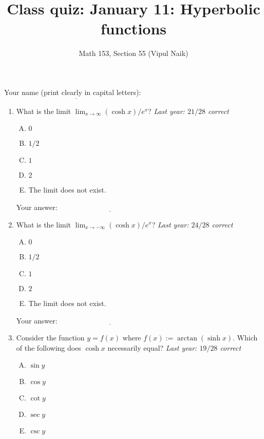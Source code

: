 \documentclass[10pt]{amsart}
\title{Class quiz: January 11: Hyperbolic functions}
\author{Math 153, Section 55 (Vipul Naik)}
\begin{document}
\maketitle

Your name (print clearly in capital letters): $\underline{\qquad\qquad\qquad\qquad\qquad\qquad\qquad\qquad\qquad\qquad}$

\begin{enumerate}
\item What is the limit $\lim_{x \to \infty} (\cosh x)/e^x$? {\em Last
  year: $21/28$ correct}

  \begin{enumerate}[(A)]
  \item $0$
  \item $1/2$
  \item $1$
  \item $2$
  \item The limit does not exist.
  \end{enumerate}

  \vspace{0.1in}
  Your answer: $\underline{\qquad\qquad\qquad\qquad\qquad\qquad\qquad}$
  \vspace{0.4in}

\item What is the limit $\lim_{x \to -\infty} (\cosh x)/e^x$? {\em
  Last year: $24/28$ correct}

  \begin{enumerate}[(A)]
  \item $0$
  \item $1/2$
  \item $1$
  \item $2$
  \item The limit does not exist.
  \end{enumerate}

  \vspace{0.1in}
  Your answer: $\underline{\qquad\qquad\qquad\qquad\qquad\qquad\qquad}$
  \vspace{0.4in}

\item Consider the function $y = f(x)$ where $f(x) := \arctan(\sinh
  x)$. Which of the following does $\cosh x$ necessarily equal? {\em
  Last year: $19/28$ correct}

  \begin{enumerate}[(A)]
  \item $\sin y$
  \item $\cos y$
  \item $\cot y$
  \item $\sec y$
  \item $\csc y$
  \end{enumerate}


\end{enumerate}
\end{document}
